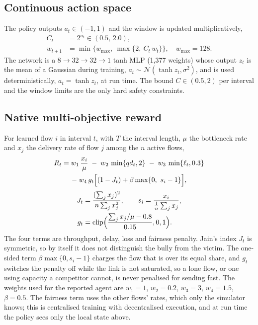 \subsection{Continuous action space}
The policy outputs $a_t\in(-1,1)$ and the window is updated multiplicatively,
\begin{align}
C_t&=2^{a_t}\in(0.5,\,2.0),\\
w_{t+1}&=\min\{w_{\max},\ \max\{2,\ C_t\,w_t\}\},\quad w_{\max}=128.
\end{align}
The network is a $8\!\to\!32\!\to\!32\!\to\!1$ tanh MLP (1{,}377 weights) whose output $z_t$ is the mean of a Gaussian during training, $a_t\sim\mathcal{N}(\tanh z_t,\sigma^2)$, and is used deterministically, $a_t=\tanh z_t$, at run time. The bound $C\in(0.5,2)$ per interval and the window limits are the only hard safety constraints.

\subsection{Native multi-objective reward}
For learned flow $i$ in interval $t$, with $T$ the interval length, $\mu$ the bottleneck rate and $x_j$ the delivery rate of flow $j$ among the $n$ active flows,
\begin{multline}
R_t=w_1\,\frac{x_i}{\mu}\;-\;w_2\,\min\{qd_t,2\}\;-\;w_3\,\min\{\ell_t,0.3\}\\
-\;w_4\,g_t\Bigl[(1-J_t)+\beta\max\{0,\ s_i-1\}\Bigr],
\end{multline}
\begin{align}
J_t&=\frac{(\sum_j x_j)^2}{n\sum_j x_j^2},\qquad s_i=\frac{x_i}{\frac1n\sum_j x_j},\\
g_t&=\operatorname{clip}\Bigl(\frac{\sum_j x_j/\mu-0.8}{0.15},0,1\Bigr).
\end{align}
The four terms are throughput, delay, loss and fairness penalty.
Jain's index $J_t$ is symmetric, so by itself it does not distinguish the bully from the victim. The one-sided term $\beta\max\{0,s_i-1\}$ charges the flow that is over its equal share, and $g_t$ switches the penalty off while the link is not saturated, so a lone flow, or one using capacity a competitor cannot, is never penalised for sending fast. The weights used for the reported agent are $w_1=1$, $w_2=0.2$, $w_3=3$, $w_4=1.5$, $\beta=0.5$. The fairness term uses the other flows' rates, which only the simulator knows; this is centralised training with decentralised execution, and at run time the policy sees only the local state above.

